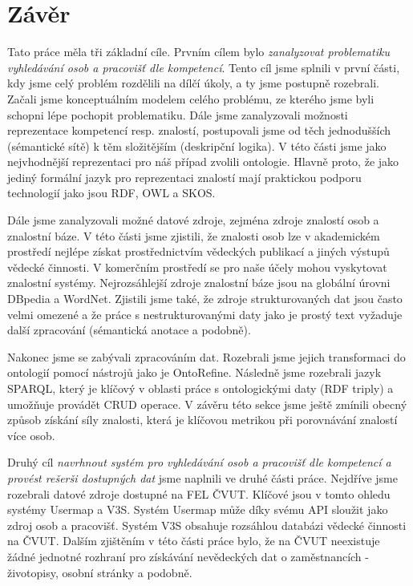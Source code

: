 \chapter{Závěr}
Tato práce měla tři základní cíle. Prvním cílem bylo \textit{zanalyzovat problematiku vyhledávání osob a pracovišť dle kompetencí}. Tento cíl jsme splnili v první části, kdy jsme celý problém rozdělili na dílčí úkoly, a ty jsme postupně rozebrali. Začali jsme konceptuálním modelem celého problému, ze kterého jsme byli schopni lépe pochopit problematiku. Dále jsme zanalyzovali možnosti reprezentace kompetencí resp. znalostí, postupovali jsme od těch jednodušších (sémantické sítě) k těm složitějším (deskripční logika). V této části jsme jako nejvhodnější reprezentaci pro náš případ zvolili ontologie.  Hlavně proto, že jako jediný formální jazyk pro reprezentaci znalostí mají praktickou podporu technologií jako jsou RDF, OWL a SKOS. \par
Dále jsme zanalyzovali možné datové zdroje, zejména zdroje znalostí osob a znalostní báze. V této části jsme zjistili, že znalosti osob lze v akademickém prostředí nejlépe získat prostřednictvím vědeckých publikací a jiných výstupů vědecké činnosti. V komerčním prostředí se pro naše účely mohou vyskytovat znalostní systémy. Nejrozsáhlejší zdroje znalostní báze jsou na globální úrovni DBpedia a WordNet. Zjistili jsme také, že zdroje strukturovaných dat jsou často velmi omezené a že práce s nestrukturovanými daty jako je prostý text vyžaduje další zpracování (sémantická anotace a podobně).\par
Nakonec jsme se zabývali zpracováním dat. Rozebrali jsme jejich transformaci do ontologií pomocí nástrojů jako je OntoRefine. Následně jsme rozebrali jazyk SPARQL, který je klíčový v oblasti práce s ontologickými daty (RDF triply) a umožňuje provádět CRUD operace. V závěru této sekce jsme ještě zmínili obecný způsob získání síly znalosti, která je klíčovou metrikou při porovnávání znalostí více osob.
\par
Druhý cíl \textit{navrhnout systém pro vyhledávání osob a pracovišť dle kompetencí a provést rešerši dostupných dat} jsme naplnili ve druhé části práce. Nejdříve jsme rozebrali datové zdroje dostupné na FEL ČVUT. Klíčové jsou v tomto ohledu systémy Usermap a V3S. Systém Usermap může díky svému API sloužit jako zdroj osob a pracovišť. Systém V3S obsahuje rozsáhlou databázi vědecké činnosti na ČVUT. Dalším zjištěním v této části práce bylo, že na ČVUT neexistuje žádné jednotné rozhraní pro získávání nevědeckých dat o zaměstnancích - životopisy, osobní stránky a podobně.\par
